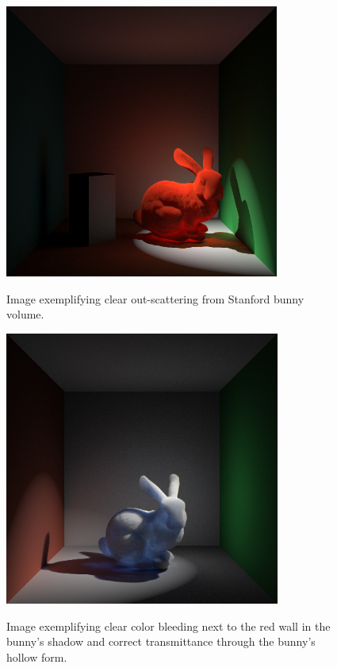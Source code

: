 \documentclass[12pt]{ucthesis}
\newcommand{\captionfonts}{\small\bf\ssp}
\begin{document}
\begin{figure}[h!]
    \centering
    \includegraphics[height=90mm]{img/ketchup_good_corrected.png}
    \captionfonts
    \caption{Image exemplifying clear out-scattering from Stanford bunny volume.}
\end{figure}

\begin{figure}[h!]
    \centering
    \includegraphics[height=90mm]{img/bunny_spot/spot_right_new.png}
    \captionfonts
    \caption{Image exemplifying clear color bleeding next to the red wall in the bunny's shadow and correct transmittance through the bunny's hollow form.}
\end{figure}
\end{document}
